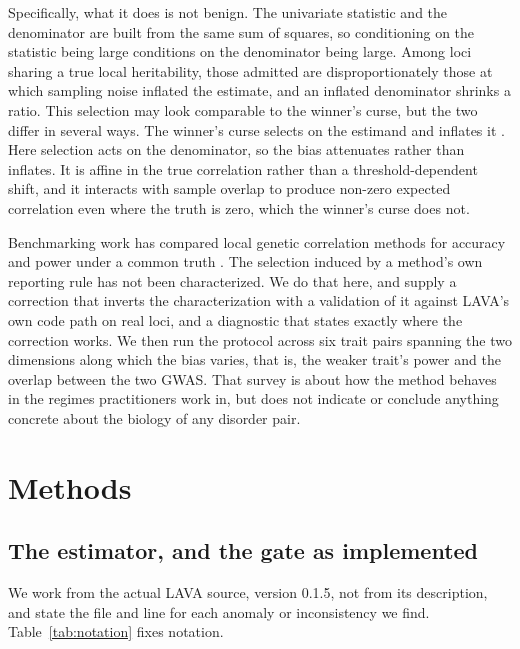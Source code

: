 \documentclass[12pt,a4paper]{article}
\begin{document}
Specifically, what it does is not benign. The univariate statistic and the denominator are
built from the same sum of squares, so conditioning on the statistic being large conditions
on the denominator being large. Among loci sharing a true local heritability, those
admitted are disproportionately those at which sampling noise inflated the estimate, and an
inflated denominator shrinks a ratio. This selection may look comparable to the winner's
curse, but the two differ in several ways. The winner's curse selects on the estimand and
inflates it \citep{ref3,ref4}. Here selection acts on the denominator, so the bias
attenuates rather than inflates. It is affine in the true correlation rather than a
threshold-dependent shift, and it interacts with sample overlap to produce non-zero
expected correlation even where the truth is zero, which the winner's curse does not.

Benchmarking work has compared local genetic correlation methods for accuracy and power
under a common truth \citep{ref5}. The selection induced by a method's own reporting rule
has not been characterized. We do that here, and supply a correction that inverts the
characterization with a validation of it against LAVA's own code path on real loci, and a
diagnostic that states exactly where the correction works. We then run the protocol across
six trait pairs spanning the two dimensions along which the bias varies, that is, the
weaker trait's power and the overlap between the two GWAS. That survey is about how the
method behaves in the regimes practitioners work in, but does not indicate or conclude
anything concrete about the biology of any disorder pair.

\section{Methods}\label{sec:methods}

\subsection{The estimator, and the gate as implemented}\label{sec:estimator}

We work from the actual LAVA source, version 0.1.5, not from its description, and state the
file and line for each anomaly or inconsistency we find. Table~\ref{tab:notation} fixes
notation.
\end{document}
